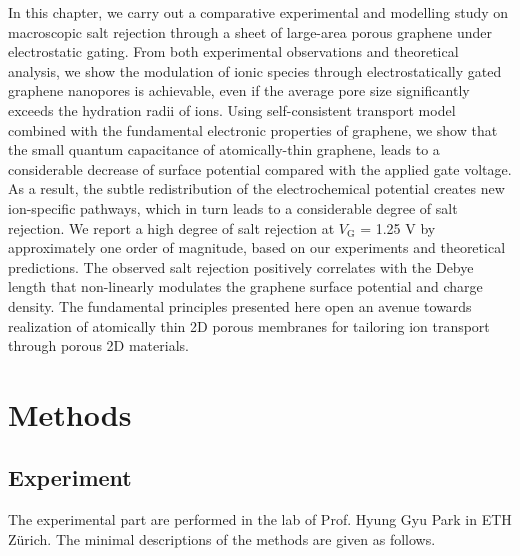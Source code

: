 In this chapter, we carry out a comparative experimental and modelling
study on macroscopic salt rejection through a sheet of large-area
porous graphene under electrostatic gating.
%
From both experimental observations and theoretical analysis, we show
the modulation of ionic species through electrostatically gated
graphene nanopores is achievable, even if the average pore size significantly exceeds the hydration radii of ions.
%
Using self-consistent transport model combined with the fundamental
electronic properties of graphene, we show that the small quantum
capacitance of atomically-thin graphene, leads to a considerable
decrease of surface potential compared with the applied gate
voltage.
%
As a result, the subtle redistribution of the electrochemical
potential creates new ion-specific pathways, which in turn
leads to a considerable degree of salt rejection.
%
We report a high
degree of salt rejection at $V_{\mathrm{G}}$ = 1.25 V by approximately
one order of magnitude, based on our experiments and theoretical
predictions.
%
The observed salt rejection positively correlates with the Debye
length that non-linearly modulates the graphene surface potential and
charge density.
%
The fundamental principles presented here open an avenue towards
realization of atomically thin 2D porous membranes for tailoring ion
transport through porous 2D materials.

\section{Methods}
\label{sec:np-methods}

\subsection*{Experiment}
\label{sec:np-met-experiment}

The experimental part are performed in the lab of Prof. Hyung Gyu Park
in ETH Zürich. The minimal descriptions of the methods are given as
follows.


\vspace{1em}
\noindent
